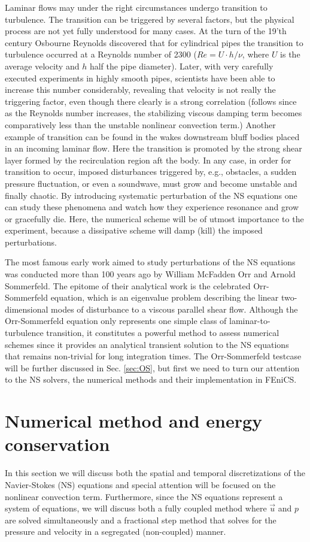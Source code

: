 Laminar flows may under the right circumstances undergo transition to turbulence. The transition can be triggered by several factors, but the physical process are not yet fully understood for many cases. At the turn of the 19'th century Osbourne Reynolds discovered that for cylindrical pipes the transition to turbulence occurred at a Reynolds number of 2300 ($Re=U\cdot h/\nu$, where $U$ is the average velocity and $h$ half the pipe diameter). Later, with very carefully executed experiments in highly smooth pipes, scientists have been able to increase this number considerably, revealing that velocity is not really the triggering factor, even though there clearly is a strong correlation (follows since as the Reynolds number increases, the stabilizing viscous damping term becomes comparatively less than the unstable nonlinear convection term.) Another example of transition can be found in the wakes downstream bluff bodies placed in an incoming laminar flow. Here the transition is promoted by the strong shear layer formed by the recirculation region aft the body. In any case, in order for transition to occur, imposed disturbances triggered by, e.g., obstacles, a sudden pressure fluctuation, or even a soundwave, must grow and become unstable and finally chaotic. By introducing systematic perturbation of the NS equations one can study these phenomena and watch how they experience resonance and grow or gracefully die. Here, the numerical scheme will be of utmost importance to the experiment, because a dissipative scheme will damp (kill) the imposed perturbations.

The most famous early work aimed to study perturbations of the NS equations was conducted more than 100 years ago by William McFadden Orr and Arnold Sommerfeld. The epitome of their analytical work is the celebrated Orr-Sommerfeld equation, which is an eigenvalue problem describing the linear two-dimensional modes of disturbance to a viscous parallel shear flow. Although the Orr-Sommerfeld equation only represents one simple class of laminar-to-turbulence transition, it constitutes a powerful method to assess numerical schemes since it provides an analytical transient solution to the NS equations that remains non-trivial for long integration times. The Orr-Sommerfeld testcase will be further discussed in Sec. \ref{sec:OS}, but first we need to turn our attention to the NS solvers, the numerical methods and their implementation in FEniCS.

\section{Numerical method and energy conservation}
\label{sec:Numerical}
In this section we will discuss both the spatial and temporal discretizations of the Navier-Stokes (NS) equations and special attention will be focused on the nonlinear convection term. Furthermore, since the NS equations represent a system of equations, we will discuss both a fully coupled method where $\vec{u}$ and $p$ are solved simultaneously and a fractional step method that solves for the pressure and velocity in a segregated (non-coupled) manner.

